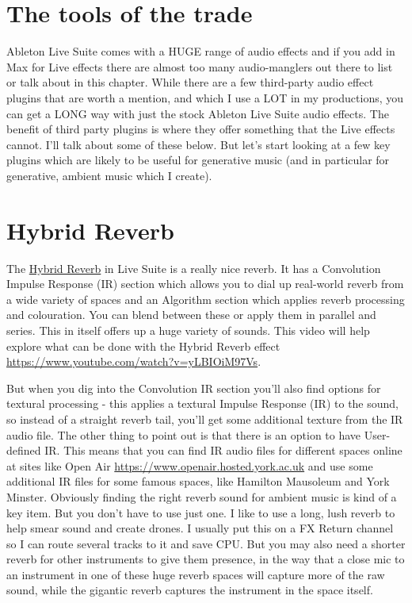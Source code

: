 \documentclass[
  12pt,
  letterpaper,
  oneside,
  open=any]{scrbook}
\begin{document}
\section{The tools of the trade}\label{the-tools-of-the-trade}

Ableton Live Suite comes with a HUGE range of audio effects and if you
add in Max for Live effects there are almost too many audio-manglers out
there to list or talk about in this chapter. While there are a few
third-party audio effect plugins that are worth a mention, and which I
use a LOT in my productions, you can get a LONG way with just the stock
Ableton Live Suite audio effects. The benefit of third party plugins is
where they offer something that the Live effects cannot. I'll talk about
some of these below. But let's start looking at a few key plugins which
are likely to be useful for generative music (and in particular for
generative, ambient music which I create).

\section{Hybrid Reverb}\label{hybrid-reverb}

The
\href{https://www.ableton.com/en/live-manual/11/live-audio-effect-reference/\#hybrid-reverb}{Hybrid
Reverb} in Live Suite is a really nice reverb. It has a Convolution
Impulse Response (IR) section which allows you to dial up real-world
reverb from a wide variety of spaces and an Algorithm section which
applies reverb processing and colouration. You can blend between these
or apply them in parallel and series. This in itself offers up a huge
variety of sounds. This video will help explore what can be done with
the Hybrid Reverb effect
\url{https://www.youtube.com/watch?v=yLBIOiM97Vs}.

But when you dig into the Convolution IR section you'll also find
options for textural processing - this applies a textural Impulse
Response (IR) to the sound, so instead of a straight reverb tail, you'll
get some additional texture from the IR audio file. The other thing to
point out is that there is an option to have User-defined IR. This means
that you can find IR audio files for different spaces online at sites
like Open Air \url{https://www.openair.hosted.york.ac.uk} and use some
additional IR files for some famous spaces, like Hamilton Mausoleum and
York Minster. Obviously finding the right reverb sound for ambient music
is kind of a key item. But you don't have to use just one. I like to use
a long, lush reverb to help smear sound and create drones. I usually put
this on a FX Return channel so I can route several tracks to it and save
CPU. But you may also need a shorter reverb for other instruments to
give them presence, in the way that a close mic to an instrument in one
of these huge reverb spaces will capture more of the raw sound, while
the gigantic reverb captures the instrument in the space itself.
\end{document}

